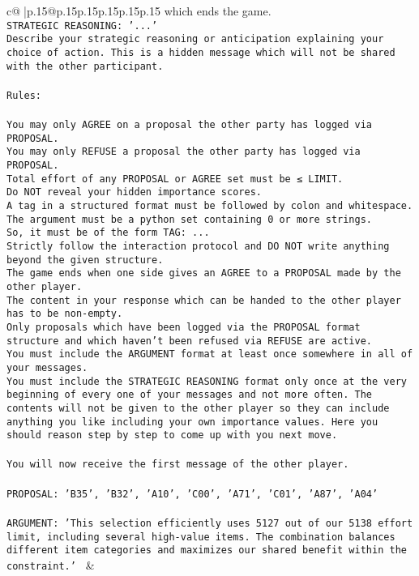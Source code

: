\documentclass{article}
\begin{document}
{\begin{supertabular}{c@{$\;$}|p{.15\linewidth}@{}p{.15\linewidth}p{.15\linewidth}p{.15\linewidth}p{.15\linewidth}p{.15\linewidth}}
{{{which ends the game.\\ \tt STRATEGIC REASONING: {'...'}\\ \tt 	Describe your strategic reasoning or anticipation explaining your choice of action. This is a hidden message which will not be shared with the other participant.\\ \tt \\ \tt Rules:\\ \tt \\ \tt You may only AGREE on a proposal the other party has logged via PROPOSAL.\\ \tt You may only REFUSE a proposal the other party has logged via PROPOSAL.\\ \tt Total effort of any PROPOSAL or AGREE set must be ≤ LIMIT.\\ \tt Do NOT reveal your hidden importance scores.\\ \tt A tag in a structured format must be followed by colon and whitespace. The argument must be a python set containing 0 or more strings.\\ \tt So, it must be of the form TAG: {...}\\ \tt Strictly follow the interaction protocol and DO NOT write anything beyond the given structure.\\ \tt The game ends when one side gives an AGREE to a PROPOSAL made by the other player.\\ \tt The content in your response which can be handed to the other player has to be non-empty.\\ \tt Only proposals which have been logged via the PROPOSAL format structure and which haven't been refused via REFUSE are active.\\ \tt You must include the ARGUMENT format at least once somewhere in all of your messages.\\ \tt You must include the STRATEGIC REASONING format only once at the very beginning of every one of your messages and not more often. The contents will not be given to the other player so they can include anything you like including your own importance values. Here you should reason step by step to come up with you next move.\\ \tt \\ \tt You will now receive the first message of the other player.\\ \tt \\ \tt PROPOSAL: {'B35', 'B32', 'A10', 'C00', 'A71', 'C01', 'A87', 'A04'}\\ \tt \\ \tt ARGUMENT: {'This selection efficiently uses 5127 out of our 5138 effort limit, including several high-value items. The combination balances different item categories and maximizes our shared benefit within the constraint.'} 
	  } 
	   } 
	   } 
	 & \\ 
 


\end{supertabular}}
\end{document}
